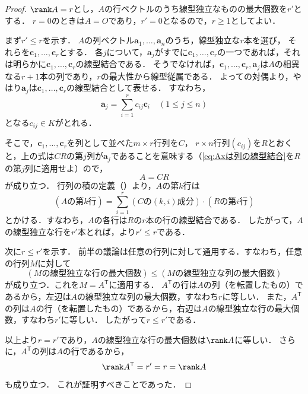 \begin{tleftbar}
\begin{proof}
  $\rank A = r$とし，$A$の行ベクトルのうち線型独立なものの最大個数を$r'$とする．
  $r = 0$のときは$A = O$であり，$r' = 0$となるので，$r \ge 1$としてよい．

  まず$r' \le r$を示す．
  $A$の列ベクトル$\bm{a}_1, \dots, \bm{a}_n$のうち，線型独立な$r$本を選び，
  それらを$\bm{c}_1, \dots, \bm{c}_r$とする．
  各$j$について，$\bm{a}_j$がすでに$\bm{c}_1, \dots, \bm{c}_r$の一つであれば，それは明らかに$\bm{c}_1, \dots, \bm{c}_r$の線型結合である．
  そうでなければ，$\bm{c}_1, \dots, \bm{c}_r, \bm{a}_j$は$A$の相異なる$r + 1$本の列であり，$r$の最大性から線型従属である．
  よっての対偶より，やはり$\bm{a}_j$は$\bm{c}_1, \dots, \bm{c}_r$の線型結合として表せる．
  すなわち，
  \[
    \bm{a}_j = \sum_{i=1}^{r} c_{ij} \bm{c}_i \quad (1 \le j \le n)
  \]
  となる$c_{ij} \in K$がとれる．

  そこで，$\bm{c}_1, \dots, \bm{c}_r$を列として並べた$m \times r$行列を$C$，
  $r \times n$行列$(c_{ij})$を$R$とおくと，上の式は$CR$の第$j$列が$\bm{a}_j$であることを意味する（\eqref{eq:Axは列の線型結合}を$R$の第$j$列に適用せよ）ので，
  \[
    A = CR
  \]
  が成り立つ．
  行列の積の定義（）より，$A$の第$k$行は
  \[
    (\text{$A$の第$k$行}) = \sum_{i=1}^{r} (\text{$C$の$(k,i)$成分}) \cdot (\text{$R$の第$i$行})
  \]
  とかける．すなわち，$A$の各行は$R$の$r$本の行の線型結合である．
  したがって，$A$の線型独立な行を$r'$本とれば，より$r' \le r$である．

  次に$r \le r'$を示す．
  前半の議論は任意の行列に対して通用する．すなわち，任意の行列$M$に対して
  \[
    (\text{$M$の線型独立な行の最大個数})
    \le
    (\text{$M$の線型独立な列の最大個数})
  \]
  が成り立つ．これを$M = A^\mathsf{T}$に適用する．
  $A^\mathsf{T}$の行は$A$の列（を転置したもの）であるから，左辺は$A$の線型独立な列の最大個数，すなわち$r$に等しい．
  また，$A^\mathsf{T}$の列は$A$の行（を転置したもの）であるから，右辺は$A$の線型独立な行の最大個数，すなわち$r'$に等しい．
  したがって$r \le r'$である．

  以上より$r = r'$であり，$A$の線型独立な行の最大個数は$\rank A$に等しい．
  さらに，$A^\mathsf{T}$の列は$A$の行であるから，
  \[
    \rank A^\mathsf{T} = r' = r = \rank A
  \]
  も成り立つ．
  これが証明すべきことであった．
\end{proof}
\end{tleftbar}

